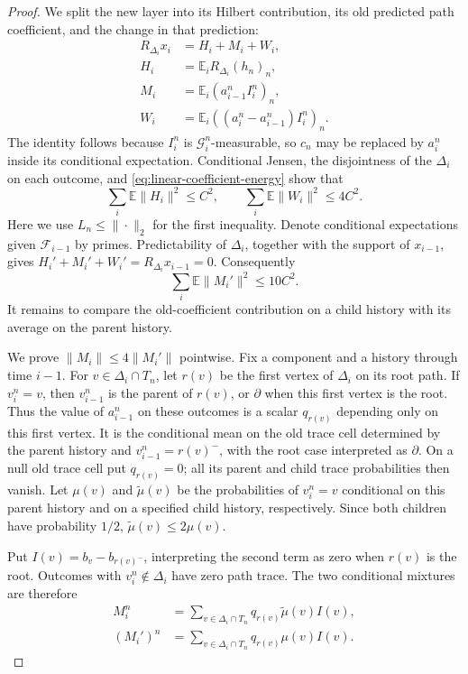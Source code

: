 \begin{proof}
We split the new layer into its Hilbert contribution, its old predicted
path coefficient, and the change in that prediction:
\begin{align*}
 R_{\Delta_i}x_i&=H_i+M_i+W_i,\\
 H_i&=\mathbb E_iR_{\Delta_i}(h_n)_n,\\
 M_i&=\mathbb E_i(a_{i-1}^nI_i^n)_n,\\
 W_i&=\mathbb E_i((a_i^n-a_{i-1}^n)I_i^n)_n.
\end{align*}
The identity follows because \(I_i^n\) is \(\mathcal G_i^n\)-measurable,
so \(c_n\) may be replaced by \(a_i^n\) inside its conditional
expectation.  Conditional Jensen, the disjointness of the \(\Delta_i\) on
each outcome, and \eqref{eq:linear-coefficient-energy} show that
\begin{equation}\label{eq:linear-HW-energy}
 \sum_i\mathbb E\|H_i\|^2\le C^2,
 \qquad \sum_i\mathbb E\|W_i\|^2\le4C^2.
\end{equation}
Here we use \(L_n\le\|\cdot\|_2\) for the first inequality.  Denote
conditional expectations given \(\mathcal F_{i-1}\) by primes.
Predictability of \(\Delta_i\), together with the support of \(x_{i-1}\),
gives \(H_i'+M_i'+W_i'=R_{\Delta_i}x_{i-1}=0\).  Consequently
\begin{equation}\label{eq:linear-old-M-energy}
 \sum_i\mathbb E\|M_i'\|^2\le10C^2.
\end{equation}
It remains to compare the old-coefficient contribution on a child
history with its average on the parent history.

We prove \(\|M_i\|\le4\|M_i'\|\) pointwise.  Fix a component and a
history through time \(i-1\).  For \(v\in \Delta_i\cap T_n\), let \(r(v)\)
be the first vertex of \(\Delta_i\) on its root path.  If \(v_i^n=v\), then
\(v_{i-1}^n\) is the parent of \(r(v)\), or \(\partial\) when this
first vertex is the root. Thus the value of \(a_{i-1}^n\) on these
outcomes is a scalar \(q_{r(v)}\) depending only on this first vertex.
It is the conditional mean on the old trace cell determined by the
parent history and \(v_{i-1}^n=r(v)^-\), with the root case interpreted
as \(\partial\). On a null old trace cell put \(q_{r(v)}=0\); all its
parent and child trace probabilities then vanish.
Let \(\mu(v)\) and \(\widetilde\mu(v)\) be the probabilities of
\(v_i^n=v\) conditional on this parent history and on a specified child
history, respectively.  Since both children have probability \(1/2\),
\(\widetilde\mu(v)\le2\mu(v)\).

Put \(I(v)=b_v-b_{r(v)^-}\), interpreting the second term as zero when
\(r(v)\) is the root. Outcomes with \(v_i^n\notin\Delta_i\) have zero
path trace. The two conditional mixtures are therefore
\[
 \begin{aligned}
 M_i^n&=\sum_{v\in\Delta_i\cap T_n}q_{r(v)}\widetilde\mu(v)I(v),\\
 (M_i')^n&=\sum_{v\in\Delta_i\cap T_n}q_{r(v)}\mu(v)I(v).
 \end{aligned}
\]


\end{proof}
